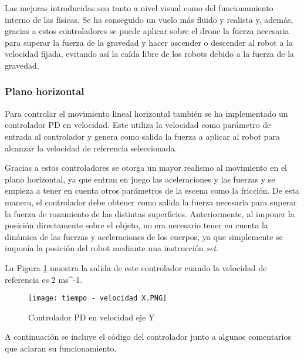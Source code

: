 \normalsize
Las mejoras introducidas son tanto a nivel visual como del funcionamiento interno de las físicas. Se ha conseguido un vuelo más fluido y realista y, además, gracias a estos controladores se puede aplicar sobre el drone la fuerza necesaria para superar la fuerza de la gravedad y hacer ascender o descender al robot a la velocidad fijada, evitando así la caída libre de los robots debido a la fuerza de la gravedad.

\subsubsection{Plano horizontal}
Para controlar el movimiento lineal horizontal también se ha implementado un controlador PD en velocidad. Este utiliza la velocidad como parámetro de entrada al controlador y genera como salida la fuerza a aplicar al robot para alcanzar la velocidad de referencia seleccionada. \newline

Gracias a estos controladores se otorga un mayor realismo al movimiento en el plano horizontal, ya que entran en juego las aceleraciones y las fuerzas y se empieza a tener en cuenta otros parámetros de la escena como la fricción. De esta manera, el controlador debe obtener como salida la fuerza necesaria para superar la fuerza de rozamiento de las distintas superficies. Anteriormente, al imponer la posición directamente sobre el objeto, no era necesario tener en cuenta la dinámica de las fuerzas y aceleraciones de los cuerpos, ya que simplemente se imponía la posición del robot mediante una instrucción \textit{set}. \newline

La Figura \ref{fig:pd_velXZ} muestra la salida de este controlador cuando la velocidad de referencia es 2 ms^{-1}.

\begin{figure}[h!]
    \centering
    \texttt{[image: tiempo - velocidad X.PNG]}
    \caption{Controlador PD en velocidad eje Y}
    \label{fig:pd_velXZ}
\end{figure}

A continuación se incluye el código del controlador junto a algunos comentarios que aclaran su funcionamiento.

